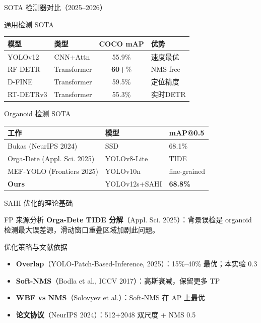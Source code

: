 \documentclass[aspectratio=169, 10pt]{beamer}
\begin{document}
\begin{frame}{SOTA 检测器对比（2025--2026）}
  \begin{block}{通用检测 SOTA}
    \begin{tabular}{llcl}
      \toprule
      模型 & 类型 & COCO mAP & 优势 \\
      \midrule
      YOLOv12 & CNN+Attn & 55.9\% & 速度最优 \\
      RF-DETR & Transformer & \textbf{60+}\% & NMS-free \\
      D-FINE & Transformer & 59.5\% & 定位精度 \\
      RT-DETRv3 & Transformer & 55.3\% & 实时DETR \\
      \bottomrule
    \end{tabular}
  \end{block}
  \vspace{0em}
  \begin{block}{Organoid 检测 SOTA}
    \begin{tabular}{lll}
      \toprule
      工作 & 模型 & mAP@0.5 \\
      \midrule
      Bukas (NeurIPS 2024) & SSD & 68.1\% \\
      Orga-Dete (Appl. Sci. 2025) & YOLOv8-Lite & TIDE \\
      MEF-YOLO (Frontiers 2025) & YOLOv10n & fine-grained \\
      \textbf{Ours} & YOLOv12s+SAHI & \textbf{68.8\%} \\
      \bottomrule
    \end{tabular}
  \end{block}
\end{frame}

\begin{frame}{SAHI 优化的理论基础}
  \begin{block}{FP 来源分析}
    \textbf{Orga-Dete TIDE 分解}（Appl. Sci. 2025）：背景误检是 organoid 检测最大误差源，滑动窗口重叠区域加剧此问题。
  \end{block}
  \vspace{0em}
  \begin{block}{优化策略与文献依据}
    \begin{itemize}
      \item \textbf{Overlap}（YOLO-Patch-Based-Inference, 2025）：15\%--40\% 最优；本实验 0.3
      \item \textbf{Soft-NMS}（Bodla et al., ICCV 2017）：高斯衰减，保留更多 TP
      \item \textbf{WBF vs NMS}（Solovyev et al.）：Soft-NMS 在 AP 上最优
      \item \textbf{论文协议}（NeurIPS 2024）：512+2048 双尺度 + NMS 0.5
    \end{itemize}
  \end{block}
\end{frame}
\end{document}
